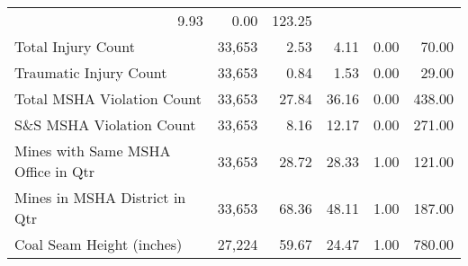 \begin{table}[!h]
\begin{tabular}{llllll}
  \multicolumn{1}{r}{9.93} &
  \multicolumn{1}{r}{0.00} &
  \multicolumn{1}{r}{123.25} \\
\multicolumn{1}{l}{Total Injury Count} &
  \multicolumn{1}{|r}{33,653} &
  \multicolumn{1}{r}{2.53} &
  \multicolumn{1}{r}{4.11} &
  \multicolumn{1}{r}{0.00} &
  \multicolumn{1}{r}{70.00} \\
\multicolumn{1}{l}{Traumatic Injury Count} &
  \multicolumn{1}{|r}{33,653} &
  \multicolumn{1}{r}{0.84} &
  \multicolumn{1}{r}{1.53} &
  \multicolumn{1}{r}{0.00} &
  \multicolumn{1}{r}{29.00} \\
\multicolumn{1}{l}{Total MSHA Violation Count} &
  \multicolumn{1}{|r}{33,653} &
  \multicolumn{1}{r}{27.84} &
  \multicolumn{1}{r}{36.16} &
  \multicolumn{1}{r}{0.00} &
  \multicolumn{1}{r}{438.00} \\
\multicolumn{1}{l}{S\&S MSHA Violation Count} &
  \multicolumn{1}{|r}{33,653} &
  \multicolumn{1}{r}{8.16} &
  \multicolumn{1}{r}{12.17} &
  \multicolumn{1}{r}{0.00} &
  \multicolumn{1}{r}{271.00} \\
\multicolumn{1}{l}{Mines with Same MSHA Office in Qtr} &
  \multicolumn{1}{|r}{33,653} &
  \multicolumn{1}{r}{28.72} &
  \multicolumn{1}{r}{28.33} &
  \multicolumn{1}{r}{1.00} &
  \multicolumn{1}{r}{121.00} \\
\multicolumn{1}{l}{Mines in MSHA District in Qtr} &
  \multicolumn{1}{|r}{33,653} &
  \multicolumn{1}{r}{68.36} &
  \multicolumn{1}{r}{48.11} &
  \multicolumn{1}{r}{1.00} &
  \multicolumn{1}{r}{187.00} \\
\multicolumn{1}{l}{Coal Seam Height (inches)} &
  \multicolumn{1}{|r}{27,224} &
  \multicolumn{1}{r}{59.67} &
  \multicolumn{1}{r}{24.47} &
  \multicolumn{1}{r}{1.00} &
  \multicolumn{1}{r}{780.00} \\
\cline{1-6}
\end{tabular}
\end{table}

